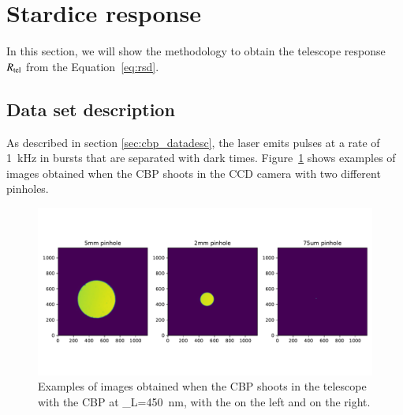 \section{Stardice response}
\label{sec:rsd}

In this section, we will show the methodology to obtain the \SD telescope response $R_{\mathrm{tel}}$ from the Equation~\ref{eq:rsd}.

\subsection{Data set description}
\label{sec:sd_datadesc}

As described in section \ref{sec:cbp_datadesc}, the laser emits pulses at a rate of \SI{1}{\kilo\hertz} in bursts that are separated with dark times. Figure~\ref{fig:ccd_examples} shows examples of images obtained when the CBP shoots in the \SD CCD camera with two different pinholes. 

\begin{figure}[h]
    \centering
    \includegraphics[width=\columnwidth]{fig/ccd_examples.pdf}
    \caption{Examples of images obtained when the CBP shoots in the \SD telescope with the CBP at \lambda_L=\SI{450}{\nm}, with the \bpinhole on the left and \spinhole on the right.}
    \label{fig:ccd_examples}
\end{figure}

